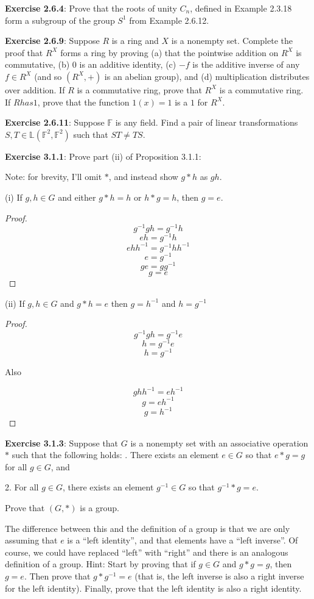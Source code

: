 \documentclass[a4paper]{article}
\begin{document}
\begin{myparindent}{0pt}
\textbf{Exercise 2.6.4}:
Prove that the roots of unity $C_n$, defined in Example 2.3.18 form a subgroup
of the group $S^1$ from Example 2.6.12. \newline

\textbf{Exercise 2.6.9}:
Suppose $R$  is a ring and $X$ is a nonempty set. Complete the proof that $R^X$
forms a ring by proving (a) that the pointwise addition on $R^X$ is commutative,
(b) 0 is an additive identity, (c) $-f$ is the additive inverse of any
$f \in R^X$ (and so $(R^X, +)$ is an abelian group), and (d) multiplication
distributes over addition. If $R$ is a commutative ring, prove that $R^X$ is a
commutative ring. If $R has 1$, prove that the function $1(x) = 1$ is a $1$
for $R^X$. \newline

\textbf{Exercise 2.6.11}:
Suppose $\mathbb{F}$ is any field. Find a pair of linear transformations
$S, T \in \mathbb{L}(\mathbb{F}^2, \mathbb{F}^2)$ such that $ST \neq TS$.
\newline

\textbf{Exercise 3.1.1}:
Prove part (ii) of Proposition 3.1.1: \newline

Note: for brevity, I'll omit $*$, and instead show $g * h$ as $gh$.

(i) If $g, h \in G$ and either $g * h = h$ or $h * g = h$, then $g = e$.
\begin{proof}
  \[ g^{-1}gh = g^{-1}h \]
  \[ eh = g^{-1}h \]
  \[ ehh^{-1} = g^{-1}hh^{-1} \]
  \[ e = g^{-1} \]
  \[ ge = gg^{-1} \]
  \[ g = e \]
\end{proof}

(ii) If $g, h \in G$ and $g * h = e$ then $g = h^{-1}$ and $h = g^{-1}$
\begin{proof}
  \[ g^{-1}gh = g^{-1}e \]
  \[ h = g^{-1}e \]
  \[ h = g^{-1} \]

  Also

  \[ ghh^{-1} = eh^{-1} \]
  \[ g = eh^{-1} \]
  \[ g = h^{-1} \]
\end{proof}

\textbf{Exercise 3.1.3}:
Suppose that $G$ is a nonempty set with an associative operation $*$ such that
the following holds: . There exists an element $e \in G$ so that $e * g = g$ for all $g \in G$, and

2. For all $g \in G$, there exists an element $g^{-1} \in G$ so that
$g^{-1} * g = e$.

Prove that $(G, *)$ is a group. \newline

The difference between this and the definition of a group is that we are only
assuming that $e$ is a “left identity”, and that elements have a “left inverse”.
Of course, we could have replaced “left” with “right” and there is an analogous
definition of a group. Hint: Start by proving that if $g \in G$ and
$g * g = g$, then $g = e$. Then prove that $g * g^{-1} = e$ (that is, the left
inverse is also a right inverse for the left identity). Finally, prove that the
left identity is also a right identity.

\end{myparindent}
\end{document}
